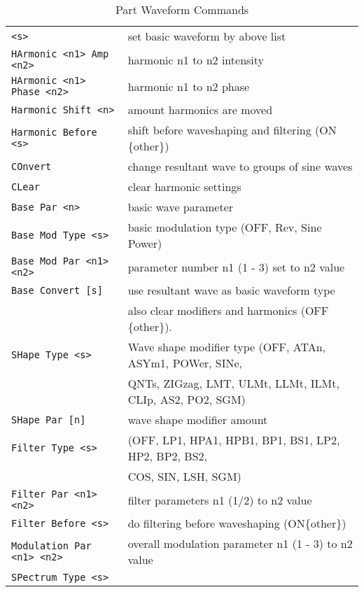    \begin{table}[H]
      \centering
      \caption{Part Waveform Commands}
      \label{table:yoshimi_part_waveform_commands}
      \begin{tabular}{l l}
   \texttt{<s>} &
      set basic waveform by above list \\
   \texttt{HArmonic <n1> Amp <n2>} &
      harmonic n1 to n2 intensity \\
   \texttt{HArmonic <n1> Phase <n2>} &
      harmonic n1 to n2 phase \\
   \texttt{Harmonic Shift <n>} &
      amount harmonics are moved \\
   \texttt{Harmonic Before <s>} &
      shift before waveshaping and filtering (ON \{other\}) \\
   \texttt{COnvert} &
       change resultant wave to groups of sine waves \\
   \texttt{CLear} &
      clear harmonic settings \\
   \texttt{Base Par <n>} &
      basic wave parameter \\
   \texttt{Base Mod Type <s>} &
      basic modulation type (OFF, Rev, Sine Power) \\
   \texttt{Base Mod Par <n1> <n2>} &
       parameter number n1 (1 - 3) set to n2 value \\
   \texttt{Base Convert [s]} &
       use resultant wave as basic waveform type \\
   \texttt{} &
      also clear modifiers and harmonics (OFF \{other\}). \\
   \texttt{SHape Type <s> } &
      Wave shape modifier type (OFF, ATAn, ASYm1, POWer, SINe,\\
   \texttt{} &
       QNTs, ZIGzag, LMT, ULMt, LLMt, ILMt, CLIp, AS2, PO2, SGM) \\
   \texttt{SHape Par [n]} &
      wave shape modifier amount \\
   \texttt{Filter Type <s>} &
      (OFF, LP1, HPA1, HPB1, BP1, BS1, LP2, HP2, BP2, BS2, \\
      \texttt{} &
      COS, SIN, LSH, SGM)\\
   \texttt{Filter Par <n1> <n2>} &
      filter parameters  n1 (1/2) to n2 value \\
   \texttt{Filter Before <s>} &
      do filtering before waveshaping (ON\{other\}) \\
   \texttt{Modulation Par <n1> <n2>} &
      overall modulation parameter n1 (1 - 3) to n2 value \\
   \texttt{SPectrum Type <s>} &

\end{tabular}
\end{table}

